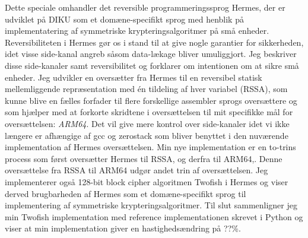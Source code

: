 Dette speciale omhandler det reversible programmeringssprog Hermes, der er udviklet på DIKU som et domæne-specifikt sprog med henblik på implementatering af symmetriske krypteringsalgoritmer på små enheder.
Reversibiliteten i Hermes gør os i stand til at give nogle garantier for sikkerheden, idet visse side-kanal angreb såsom data-lækage bliver umuliggjort. Jeg beskriver disse side-kanaler samt reversibilitet og forklarer om intentionen om at sikre små enheder.
Jeg udvikler en oversætter fra Hermes til en reversibel statisk mellemliggende repræsentation med én tildeling af hver variabel (RSSA), som kunne blive en fælles forfader til flere forskellige assembler sprogs oversættere og som hjælper med at forkorte skridtene i oversættelsen til mit specifikke mål for oversættelsen: \emph{ARM64}.
Det vil give mere kontrol over side-kanaler idet vi ikke længere er afhængige af gcc og zerostack som bliver benyttet i den nuværende implementation af Hermes oversættelsen.
Min nye implementation er en to-trins process som først oversætter Hermes til RSSA, og derfra til ARM64,. Denne oversættelse fra RSSA til ARM64 udgør andet trin af oversættelsen.
Jeg implementerer også 128-bit block cipher algoritmen Twofish i Hermes og viser derved brugbarheden af Hermes som et domæne-specifikt sprog til implementering af symmetriske krypteringsalgoritmer.
Til slut sammenligner jeg min Twofish implementation med reference implementationen skrevet i Python og viser at min implementation giver en hastighedsændring på ??\%. 
